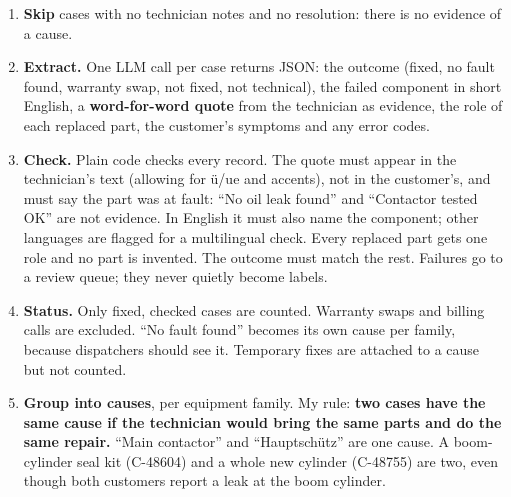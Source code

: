 \documentclass[11pt,a4paper]{article}
\begin{document}
\begin{enumerate}
  \item \textbf{Skip} cases with no technician notes and no resolution: there is no evidence of a cause.
  \item \textbf{Extract.} One LLM call per case returns JSON: the outcome (fixed, no fault found, warranty swap, not fixed, not technical), the failed component in short English, a \textbf{word-for-word quote} from the technician as evidence, the role of each replaced part, the customer's symptoms and any error codes.
  \item \textbf{Check.} Plain code checks every record. The quote must appear in the technician's text (allowing for ü/ue and accents), not in the customer's, and must say the part was at fault: “No oil leak found” and “Contactor tested OK” are not evidence. In English it must also name the component; other languages are flagged for a multilingual check. Every replaced part gets one role and no part is invented. The outcome must match the rest. Failures go to a review queue; they never quietly become labels.
  \item \textbf{Status.} Only fixed, checked cases are counted. Warranty swaps and billing calls are excluded. “No fault found” becomes its own cause per family, because dispatchers should see it. Temporary fixes are attached to a cause but not counted.
  \item \textbf{Group into causes}, per equipment family. My rule: \textbf{two cases have the same cause if the technician would bring the same parts and do the same repair.} “Main contactor” and “Hauptschütz” are one cause. A boom-cylinder seal kit (C-48604) and a whole new cylinder (C-48755) are two, even though both customers report a leak at the boom cylinder.


\end{enumerate}
\end{document}
